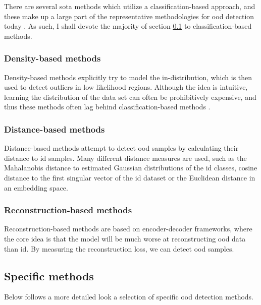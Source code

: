 \documentclass[UKenglish]{uiomasterthesis} %
\theoremstyle{definition}
\begin{document}
There are several \ac{sota} methods which utilize a classification-based approach, and these make up a large part of the representative methodologies for \ac{ood} detection today \cite[8]{oodoverview}. As such, I shall devote the majority of section \ref{ood_specific} to classification-based methods.



\subsubsection{Density-based methods}

Density-based methods explicitly try to model the in-distribution, which is then used to detect outliers in low likelihood regions. Although the idea is intuitive, learning the distribution of the data set can often be prohibitively expensive, and thus these methods often lag behind classification-based methods \cite{oodoverview}.
\\

\subsubsection{Distance-based methods} \label{section:distancebasedood}

Distance-based methods attempt to detect \ac{ood} samples by calculating their distance to \ac{id} samples. Many different distance measures are used, such as the Mahalanobis distance to estimated Gaussian distributions of the \ac{id} classes, cosine distance to the first singular vector of the \ac{id} dataset or the Euclidean distance in an embedding space.
\\

\subsubsection{Reconstruction-based methods}

Reconstruction-based methods are based on encoder-decoder frameworks, where the core idea is that the model will be much worse at reconstructing \ac{ood} data than \ac{id}. By measuring the reconstruction loss, we can detect \ac{ood} samples.
\\

\subsection{Specific methods} \label{ood_specific}

Below follows a more detailed look a selection of specific \ac{ood} detection methods.
\end{document}
